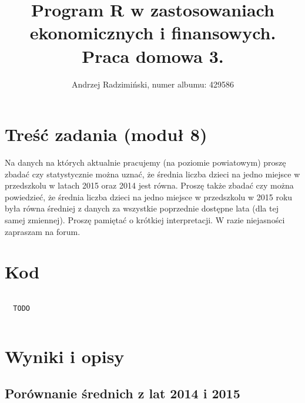 

\title{Program R w zastosowaniach ekonomicznych i finansowych. Praca domowa 3.}
\author{Andrzej Radzimiński, numer albumu: 429586}
\date{}



\renewcommand{\contentsname}{Spis treści}

\setlength{\parindent}{0pt}
\noindent

\maketitle



\section*{Treść zadania (moduł 8)}

Na danych na których aktualnie pracujemy (na poziomie powiatowym) proszę zbadać czy
statystycznie można uznać, że średnia liczba dzieci na jedno miejsce w przedszkolu w latach
2015 oraz 2014 jest równa. Proszę także zbadać czy można powiedzieć, że średnia liczba
dzieci na jedno miejsce w przedszkolu w 2015 roku była równa średniej z danych za wszystkie
poprzednie dostępne lata (dla tej samej zmiennej). Proszę pamiętać o krótkiej interpretacji. W
razie niejasności zapraszam na forum.

\newpage

\section*{Kod}

\begin{lstlisting}[language=R]

  TODO
  

\end{lstlisting}

\section*{Wyniki i opisy}

\subsection*{Porównanie średnich z lat 2014 i 2015}

\begin{verbatim}



\end{verbatim}




